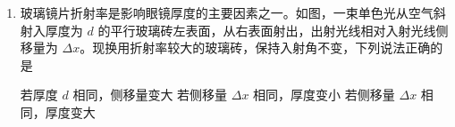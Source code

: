 \documentclass[\gkver]{gaokaozhenti}
\begin{document}
\begin{enumerate}
{$t=t_{1}+t_{2}=d\sqrt{\frac{2m}{qU}}+s\sqrt{\frac{m}{2qU}}=(d+L)\sqrt{\frac{m}{2qU}}$。

保持 S 闭合，$U$ 不变，仅 $\sqrt{\frac{q}{m}}$ 变大，$t$ 变短，故 A 错误；

B．结合 A 分析可知，保持 S 闭合，仅 $U$ 增大，$t$ 变短，故 B 错误；

C．结合 A 分析可知，保持 S 闭合，$U$ 不变，AC 位置不变，仅 B 极板向右移动，则 $d$ 增大，$s$ 减小，$L$ 不变，$t$ 变长，故 C 正确；

D．将 S 断开，极板上电荷量 $Q$ 不变，AC 位置不变，仅 B 极板向右移动，A、B 间电场强度 $E=\frac{U}{d}=\frac{Q}{Cd}=\frac{4\pi kQ}{\varepsilon S}$ 不变，则加速度不变，则有 $v^{2}=2ad$，$t_{1}=\frac{d}{\frac{v}{2}}=\frac{2d}{v}$，$t_{2}=\frac{s}{v}$，

则整个过程时间

$t=t_{1}+t_{2}=\frac{2d+s}{v}=\frac{d+L}{\sqrt{2ad}}=\frac{1}{\sqrt{2a}}\left(\sqrt{d}+\frac{L}{\sqrt{d}}\right)$，

由于 $d$ 增大但小于 $L$，$s$ 减小，$L$ 不变，根据数学知识可知，当 $d=L$ 时，$\left(\sqrt{d}+\frac{L}{\sqrt{d}}\right)$ 有最小值，可知，随着 $d$ 增大但小于 $L$，$\left(\sqrt{d}+\frac{L}{\sqrt{d}}\right)$ 减小，则总时间 $t$ 减小，故 D 错误。

故选 C。
}

\item
玻璃镜片折射率是影响眼镜厚度的主要因素之一。如图，一束单色光从空气斜射入厚度为 $d$ 的平行玻璃砖左表面，从右表面射出，出射光线相对入射光线侧移量为 $\Delta x$。现换用折射率较大的玻璃砖，保持入射角不变，下列说法正确的是 

\onepicture[h=4.5cm]{}

{若厚度 $d$ 相同，侧移量变大}
{若侧移量 $\Delta x$ 相同，厚度变小}
{若侧移量 $\Delta x$ 相同，厚度变大}

\end{enumerate}
\end{document}
